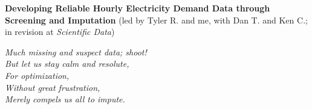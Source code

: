 \documentclass{article}
\begin{document}
\vspace{0.75cm}

\noindent
\textbf{Developing Reliable Hourly Electricity Demand Data through Screening and Imputation} (led by Tyler R. and me, with Dan T. and Ken C.; in revision at \textit{Scientific Data})\\

\vspace{0.25cm}

{\large
\noindent
\textit{Much missing and suspect data; shoot!\\
But let us stay calm and resolute,\\
\null \hspace{0.5cm} For optimization,\\
\null \hspace{0.5cm} Without great frustration,\\
Merely compels us all to impute.}
}
\end{document}
